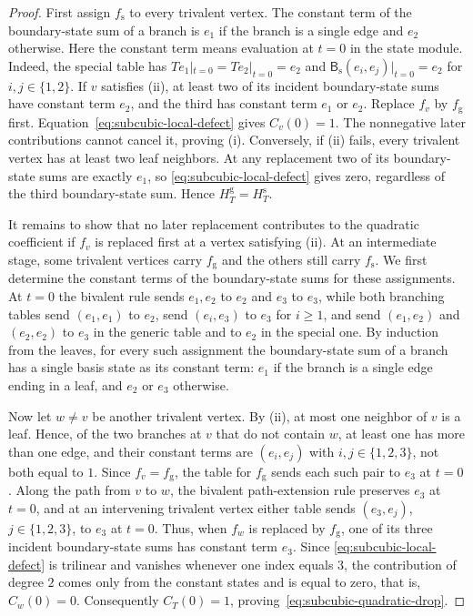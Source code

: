 \documentclass[reqno]{article}
\theoremstyle{plain} %
\theoremstyle{definition}
\theoremstyle{remark}
\numberwithin{equation}{section}
\begin{document}
\begin{proof}
First assign $f_{\mathrm s}$ to every trivalent vertex. The constant
term of the boundary-state sum of a branch is $e_1$ if the branch is a
single edge and $e_2$ otherwise. Here the constant term
means evaluation at $t=0$ in the state module. Indeed, the special table
has $T e_1|_{t=0}=T e_2|_{t=0}=e_2$ and
$\mathsf B_{\mathrm s}(e_i,e_j)|_{t=0}=e_2$ for $i,j\in\{1,2\}$.
If $v$ satisfies (ii), at least two of its incident boundary-state sums have constant
term $e_2$, and the third has constant term $e_1$ or $e_2$. Replace
$f_v$ by $f_{\mathrm g}$ first. Equation~\eqref{eq:subcubic-local-defect} gives $C_v(0)=1$.
The nonnegative later contributions cannot cancel it, proving (i).
Conversely, if (ii) fails, every trivalent vertex has at least two leaf
neighbors. At any replacement two of its boundary-state sums are exactly $e_1$, so
\eqref{eq:subcubic-local-defect} gives zero, regardless of the third
boundary-state sum. Hence $H_T^{\mathrm g}=H_T^{\mathrm s}$.

It remains to show that no later replacement contributes to the quadratic
coefficient if $f_v$ is replaced first at a vertex satisfying (ii).
At an intermediate stage, some trivalent vertices carry $f_{\mathrm g}$
and the others still carry $f_{\mathrm s}$. We first determine the
constant terms of the boundary-state sums for these assignments. At
$t=0$ the bivalent rule sends $e_1,e_2$ to $e_2$ and
$e_3$ to $e_3$, while both branching tables send $(e_1,e_1)$ to $e_2$,
send $(e_i,e_3)$ to $e_3$ for $i\ge1$, and send $(e_1,e_2)$ and $(e_2,e_2)$
to $e_3$ in the generic table and to $e_2$ in the special one. By
induction from the leaves, for every such assignment the boundary-state
sum of a branch has a single basis state as its constant term: $e_1$
if the branch is a single edge ending in a leaf, and $e_2$ or $e_3$
otherwise.

Now let $w\ne v$ be another trivalent vertex. By (ii), at most one
neighbor of $v$ is a leaf. Hence, of the two branches at $v$ that do not
contain $w$, at least one has more than one edge, and their constant terms are
$(e_i,e_j)$ with $i,j\in\{1,2,3\}$, not both equal to $1$. Since
$f_v=f_{\mathrm g}$, the table for $f_{\mathrm g}$ sends each such pair
to $e_3$ at $t=0$. Along the path from $v$ to $w$, the bivalent
path-extension rule preserves $e_3$ at $t=0$,
and at an intervening trivalent vertex either table sends $(e_3,e_j)$,
$j\in\{1,2,3\}$, to $e_3$ at $t=0$. Thus, when $f_w$ is replaced by
$f_{\mathrm g}$, one of its three incident boundary-state sums has
constant term $e_3$. Since
\eqref{eq:subcubic-local-defect} is trilinear and vanishes whenever one
index equals $3$, the contribution of degree $2$ comes only from the
constant states and is equal to zero, that is, $C_w(0)=0$.
Consequently $C_T(0)=1$, proving~\eqref{eq:subcubic-quadratic-drop}.
\end{proof}
\end{document}
